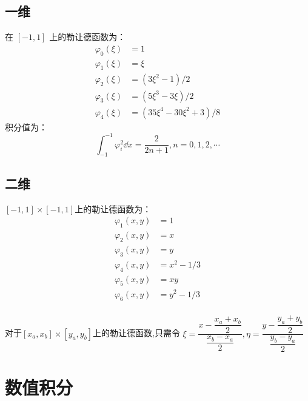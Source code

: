 \documentclass{book}
\begin{document}
\subsection{一维}
在 $[-1,1]$ 上的勒让德函数为：
\begin{equation}
  \begin{aligned}
    \varphi_{0}(\xi) & =1                                        \\
    \varphi_{1}(\xi) & =\xi                                      \\
    \varphi_{2}(\xi) & =\left(3 \xi^{2}-1\right) / 2             \\
    \varphi_{3}(\xi) & =\left(5 \xi^{3}-3 \xi\right) / 2         \\
    \varphi_{4}(\xi) & =\left(35 \xi^{4}-30 \xi^{2}+3\right) / 8
  \end{aligned}
\end{equation}
积分值为：
\begin{equation}
  \int_{-1}^{-1}\varphi_i^2\dd x=\frac{2}{2n+1},n=0,1,2,\cdots
\end{equation}

\subsection{二维}
$[-1,1]\times[-1,1]$上的勒让德函数为：
\begin{equation}
  \begin{aligned}
    \varphi_{1}(x,y) & = 1       \\
    \varphi_{2}(x,y) & = x       \\
    \varphi_{3}(x,y) & = y       \\
    \varphi_{4}(x,y) & = x^2-1/3 \\
    \varphi_{5}(x,y) & = xy      \\
    \varphi_{6}(x,y) & = y^2-1/3 \\
  \end{aligned}
\end{equation}

对于$[x_a,x_b]\times[y_a,y_b]$上的勒让德函数,只需令 $\xi=\dfrac{x - \dfrac{x_a+x_b}{2}}{\dfrac{x_b-x_a}{2}},\eta = \dfrac{y - \dfrac{y_a+y_b}{2}}{\dfrac{y_b-y_a}{2}}$
\section{数值积分}
\end{document}
